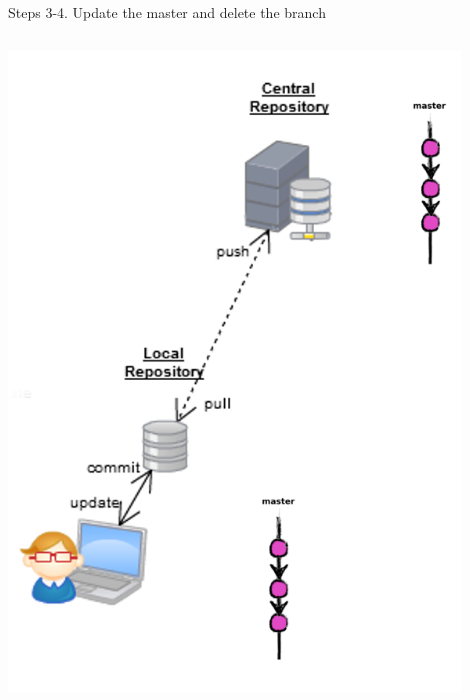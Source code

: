 \begin{frame}[fragile]{Steps 3-4. Update the master and delete the branch}
\begin{columns}
\begin{column}{0.4\textwidth}
\begin{center}
{			}\only<4> {
				\includegraphics[width=0.9\textwidth]{branch_pushed.png}
			}
		\end{center}
	\end{column}
\end{columns}
\end{frame}

